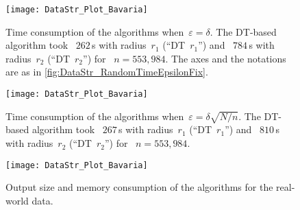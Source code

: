 \begin{figure}[h]	
\centering
\texttt{[image: DataStr\_Plot\_Bavaria]}
\vspace{-3mm}
\caption{Time consumption of the algorithms 
	when~$\varepsilon=\delta$. 
	The DT-based algorithm took~  
	$262\,$s with radius~$r_1$ (``DT~$r_1$'') and~  
	$784\,$s with radius~$r_2$ (``DT~$r_2$'') for~
    $n=553{,}984$. 
	The axes and the notations are as in 
	\fig\ref{fig:DataStr_RandomTimeEpsilonFix}.}
\label{fig:DataStr_BavariaTimeEpsilonFix}
%	
\vspace{8mm}
%
\centering
\texttt{[image: DataStr\_Plot\_Bavaria]}
\vspace{-3mm}
\caption{Time consumption of the algorithms 
	when~$\varepsilon=\delta\sqrt{N/n}$. 
	The DT-based algorithm took~ 
	$267\,$s with radius~$r_1$ (``DT~$r_1$'') and~  
	$810\,$s with radius~$r_2$ (``DT~$r_2$'') for~ 
	$n=553{,}984$.}
\label{fig:DataStr_BavariaTimeEpsilonDecrease}
%	
\vspace{8mm}
%
\centering
\texttt{[image: DataStr\_Plot\_Bavaria]}
\vspace{-6mm}
\caption{Output size and memory consumption 
	of the algorithms for the real-world data.}
\label{fig:DataStr_BavariaMemory}
\end{figure}
